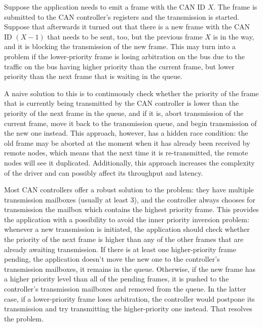 \begin{remark}[breakable]
    Suppose the application needs to emit a frame with the CAN ID $X$.
    The frame is submitted to the CAN controller's registers and the transmission is started.
    Suppose that afterwards it turned out that there is a new frame with the CAN ID $(X-1)$ that needs to be sent,
    too, but the previous frame $X$ is in the way, and it is blocking the transmission of the new frame.
    This may turn into a problem if the lower-priority frame is losing arbitration on the bus due
    to the traffic on the bus having higher priority than the current frame,
    but lower priority than the next frame that is waiting in the queue.

    A naive solution to this is to continuously check whether the priority of the frame that is currently being
    transmitted by the CAN controller is lower than the priority of the next frame in the queue, and if it is,
    abort transmission of the current frame, move it back to the transmission queue,
    and begin transmission of the new one instead.
    This approach, however, has a hidden race condition:
    the old frame may be aborted at the moment when it has already been received by remote nodes,
    which means that the next time it is re-transmitted, the remote nodes will see it duplicated.
    Additionally, this approach increases the complexity of the driver and can possibly affect
    its throughput and latency.

    Most CAN controllers offer a robust solution to the problem:
    they have multiple transmission mailboxes (usually at least 3),
    and the controller always chooses for transmission the mailbox which contains the highest priority frame.
    This provides the application with a possibility to avoid the inner priority inversion problem:
    whenever a new transmission is initiated, the application should check whether the priority of the next frame
    is higher than any of the other frames that are already awaiting transmission.
    If there is at least one higher-priority frame pending,
    the application doesn't move the new one to the controller's transmission mailboxes,
    it remains in the queue.
    Otherwise, if the new frame has a higher priority level than all of the pending frames,
    it is pushed to the controller's transmission mailboxes and removed from the queue.
    In the latter case, if a lower-priority frame loses arbitration,
    the controller would postpone its transmission and try transmitting the higher-priority one instead.
    That resolves the problem.


\end{remark}
